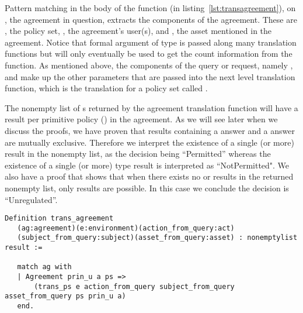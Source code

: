 Pattern matching in the body of the  function (in listing~\ref{lst:transagreement}), on , the agreement in question, extracts the components of the agreement. These are , the policy set, , the agreement's user(s), and , the asset mentioned in the agreement. Notice that formal argument  of type  is passed along many translation functions but will only eventually be used to get the count information from the  function. As mentioned above, the components of the query or request, namely ,  and  make up the other parameters that are passed into the next level translation function, which is the translation for a policy set called .


The nonempty list of s returned by the agreement translation function will have a result per primitive policy () in the agreement. As we will see later when we discuss the proofs, we have proven that results containing a  answer and a  answer are mutually exclusive. Therefore we interpret the existence of a single (or more)  result in the nonempty list, as the decision being ``Permitted'' whereas the existence of a single (or more)  type result is interpreted as ``NotPermitted". We also have a proof that shows that when there exists no  or  results in the returned nonempty list, only  results are possible. In this case we conclude the decision is ``Unregulated''. 

\begin{lstlisting}
Definition trans_agreement
   (ag:agreement)(e:environment)(action_from_query:act)
   (subject_from_query:subject)(asset_from_query:asset) : nonemptylist result :=

   match ag with
   | Agreement prin_u a ps => 
       (trans_ps e action_from_query subject_from_query asset_from_query ps prin_u a)
   end.
\end{lstlisting}

